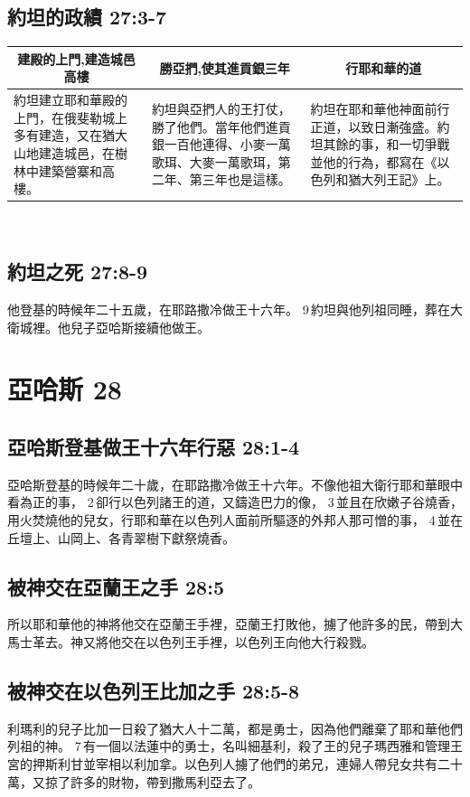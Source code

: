 \subsection{約坦的政績 27:3-7}
\begin{table}[H]
\centering
\begin{tabular}{p{}|p{}|p{}}\hline\hline
\multicolumn{1}{c|}{建殿的上門,建造城邑高樓}&\multicolumn{1}{c|}{勝亞捫,使其進貢銀三年}&\multicolumn{1}{c}{行耶和華的道}\\\hline
約坦建立耶和華殿的上門，在俄斐勒城上多有建造，又在猶大山地建造城邑，在樹林中建築營寨和高樓。
&約坦與亞捫人的王打仗，勝了他們。當年他們進貢銀一百他連得、小麥一萬歌珥、大麥一萬歌珥，第二年、第三年也是這樣。
&約坦在耶和華他神面前行正道，以致日漸強盛。約坦其餘的事，和一切爭戰並他的行為，都寫在《以色列和猶大列王記》上。\\\hline 
\end{tabular}
\end{table} 


\subsection{約坦之死 27:8-9}
他登基的時候年二十五歲，在耶路撒冷做王十六年。 9 約坦與他列祖同睡，葬在大衛城裡。他兒子亞哈斯接續他做王。


\section{亞哈斯 28 }
\subsection{亞哈斯登基做王十六年行惡 28:1-4}
亞哈斯登基的時候年二十歲，在耶路撒冷做王十六年。不像他祖大衛行耶和華眼中看為正的事， 2 卻行以色列諸王的道，又鑄造巴力的像， 3 並且在欣嫩子谷燒香，用火焚燒他的兒女，行耶和華在以色列人面前所驅逐的外邦人那可憎的事， 4 並在丘壇上、山岡上、各青翠樹下獻祭燒香。

\subsection{被神交在亞蘭王之手 28:5}
所以耶和華他的神將他交在亞蘭王手裡，亞蘭王打敗他，擄了他許多的民，帶到大馬士革去。神又將他交在以色列王手裡，以色列王向他大行殺戮。 

\subsection{被神交在以色列王比加之手 28:5-8}
利瑪利的兒子比加一日殺了猶大人十二萬，都是勇士，因為他們離棄了耶和華他們列祖的神。 7 有一個以法蓮中的勇士，名叫細基利，殺了王的兒子瑪西雅和管理王宮的押斯利甘並宰相以利加拿。以色列人擄了他們的弟兄，連婦人帶兒女共有二十萬，又掠了許多的財物，帶到撒馬利亞去了。

